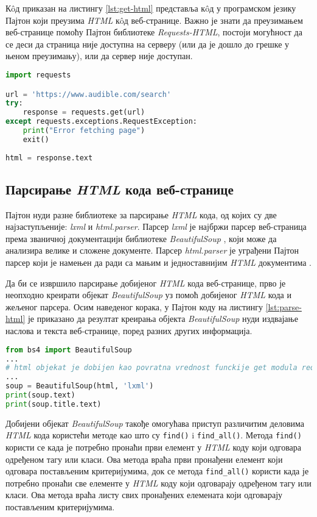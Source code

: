 \documentclass[12pt,oneside]{memoir}
\begin{document}
Кôд приказан на листингу \ref{lst:get-html} представља кôд у програмском језику Пајтон који преузима \textit{HTML} кôд веб-странице. Важно је знати да преузимањем веб-странице помоћу Пајтон библиотеке \textit{Requests-HTML}, постоји могућност да се деси да страница није доступна на серверу (или да је дошло до грешке у њеном преузимању), или да сервер није доступан.
\begin{lstlisting}[language=Python, caption={Прикупљање \textit{HTML} кода веб-странице}, label={lst:get-html}]
import requests

url = 'https://www.audible.com/search'
try: 
    response = requests.get(url) 
except requests.exceptions.RequestException:
    print("Error fetching page")
    exit()    
    
html = response.text
\end{lstlisting}

\subsection{Парсирање \textit{HTML} кода веб-странице}
Пајтон нуди разне библиотеке за парсирање \textit{HTML} кода, од којих су две најзаступљеније: \textit{lxml} и \textit{html.parser}. Парсер \textit{lxml} је најбржи парсер веб-страница према званичној документацији библиотеке \textit{BeautifulSoup} \cite{beautifulSoapDocs}, који може да анализира велике и сложене документе. Парсер \textit{html.parser} је уграђени Пајтон парсер који је намењен да ради са мањим и једноставнијим \textit{HTML} документима \cite{WebScrapingWithPython}.

Да би се извршило парсирање добијеног \textit{HTML} кода веб-странице, прво је неопходно креирати објекат \textit{BeautifulSoup} уз помоћ добијеног \textit{HTML} кода и жељеног парсера. Осим наведеног корака, у Пајтон коду на листингу \ref{lst:parse-html} је приказано да резултат креирања објекта \textit{BeautifulSoup} нуди издвајање наслова и текста веб-странице, поред разних других информација.

\begin{lstlisting}[language=Python, caption={Креирање објекта \textit{BeautifulSoup}}, label={lst:parse-html}]
from bs4 import BeautifulSoup
...
# html objekat je dobijen kao povratna vrednost funckije get modula requests
...
soup = BeautifulSoup(html, 'lxml')
print(soup.text)
print(soup.title.text)
\end{lstlisting}

Добијени објекат \textit{BeautifulSoup} такође омогућава приступ различитим деловима \textit{HTML} кода користећи методе као што су \texttt{find()} i \texttt{find\_all()}. Метода \texttt{find()} користи се када је потребно пронаћи први елемент у \textit{HTML} коду који одговара одређеном тагу или класи. Ова метода враћа први пронађени елемент који одговара постављеним критеријумима, док се метода \texttt{find\_all()} користи када је потребно пронаћи све елементе у \textit{HTML} коду који одговарају одређеном тагу или класи. Ова метода враћа листу свих пронађених елемената који одговарају постављеним критеријумима.
\end{document}
